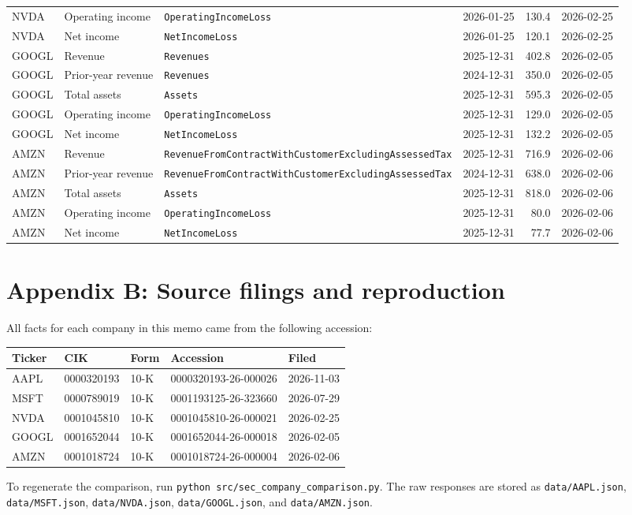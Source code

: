 \documentclass[11pt]{article}
\newcommand{\RevenueTag}{\texttt{RevenueFromContractWith\allowbreak CustomerExcluding\allowbreak AssessedTax}}
\begin{document}
\begin{longtable}{@{}l>{\raggedright\arraybackslash}p{2.55cm}>{\raggedright\arraybackslash}p{5.65cm}lrl@{}}
NVDA & Operating income & \texttt{OperatingIncomeLoss} & 2026-01-25 & 130.4 & 2026-02-25 \\
NVDA & Net income & \texttt{NetIncomeLoss} & 2026-01-25 & 120.1 & 2026-02-25 \\
\addlinespace[3pt]
GOOGL & Revenue & \texttt{Revenues} & 2025-12-31 & 402.8 & 2026-02-05 \\
GOOGL & Prior-year revenue & \texttt{Revenues} & 2024-12-31 & 350.0 & 2026-02-05 \\
GOOGL & Total assets & \texttt{Assets} & 2025-12-31 & 595.3 & 2026-02-05 \\
GOOGL & Operating income & \texttt{OperatingIncomeLoss} & 2025-12-31 & 129.0 & 2026-02-05 \\
GOOGL & Net income & \texttt{NetIncomeLoss} & 2025-12-31 & 132.2 & 2026-02-05 \\
\addlinespace[3pt]
AMZN & Revenue & \RevenueTag & 2025-12-31 & 716.9 & 2026-02-06 \\
AMZN & Prior-year revenue & \RevenueTag & 2024-12-31 & 638.0 & 2026-02-06 \\
AMZN & Total assets & \texttt{Assets} & 2025-12-31 & 818.0 & 2026-02-06 \\
AMZN & Operating income & \texttt{OperatingIncomeLoss} & 2025-12-31 & 80.0 & 2026-02-06 \\
AMZN & Net income & \texttt{NetIncomeLoss} & 2025-12-31 & 77.7 & 2026-02-06 \\
\end{longtable}
\normalsize

\section*{Appendix B: Source filings and reproduction}

All facts for each company in this memo came from the following accession:

\begin{center}
\small
\begin{tabular}{@{}lllll@{}}
\toprule
Ticker & CIK & Form & Accession & Filed \\
\midrule
AAPL & 0000320193 & 10-K & 0000320193-26-000026 & 2026-11-03 \\
MSFT & 0000789019 & 10-K & 0001193125-26-323660 & 2026-07-29 \\
NVDA & 0001045810 & 10-K & 0001045810-26-000021 & 2026-02-25 \\
GOOGL & 0001652044 & 10-K & 0001652044-26-000018 & 2026-02-05 \\
AMZN & 0001018724 & 10-K & 0001018724-26-000004 & 2026-02-06 \\
\bottomrule
\end{tabular}
\end{center}

To regenerate the comparison, run \texttt{python src/sec\_company\_comparison.py}. The raw responses are stored as \texttt{data/AAPL.json}, \texttt{data/MSFT.json}, \texttt{data/NVDA.json}, \texttt{data/GOOGL.json}, and \texttt{data/AMZN.json}.
\end{document}
